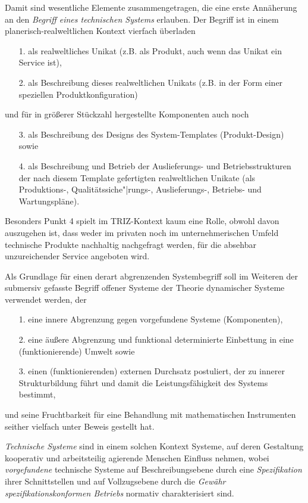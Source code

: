 \documentclass[12pt,a4paper]{article}
\begin{document}
Damit sind wesentliche Elemente zusammengetragen, die eine erste Annäherung an
den \emph{Begriff eines technischen Systems} erlauben.  Der Begriff ist in
einem planerisch-realweltlichen Kontext vierfach überladen
\begin{itemize}
\item [1.] als realweltliches Unikat (z.B. als Produkt, auch wenn das Unikat
  ein Service ist),
\item [2.] als Beschreibung dieses realweltlichen Unikats (z.B. in der Form
  einer speziellen Produktkonfiguration)
\end{itemize}
und für in größerer Stückzahl hergestellte Komponenten auch noch
\begin{itemize}
\item [3.] als Beschreibung des Designs des System-Templates (Produkt-Design)
  sowie
\item [4.] als Beschreibung und Betrieb der Auslieferungs- und
  Betriebsstrukturen der nach diesem Template gefertigten realweltlichen
  Unikate (als Produktions-, Qualitätssiche"|rungs-, Auslieferungs-, Betriebs-
  und Wartungspläne).
\end{itemize}
Besonders Punkt 4 spielt im TRIZ-Kontext kaum eine Rolle, obwohl davon
auszugehen ist, dass weder im privaten noch im unternehmerischen Umfeld
technische Produkte nachhaltig nachgefragt werden, für die absehbar
unzureichender Service angeboten wird.

Als Grundlage für einen derart abgrenzenden Systembegriff soll im Weiteren der
submersiv gefasste Begriff offener Systeme der Theorie dynamischer Systeme
\cite{Bertalanffy1950} verwendet werden, der
\begin{itemize}
\item [1.] eine innere Abgrenzung gegen vorgefundene Systeme (Komponenten), 
\item [2.] eine äußere Abgrenzung und funktional determinierte Einbettung in
  eine (funktionierende) Umwelt sowie
\item [3.] einen (funktionierenden) externen Durchsatz postuliert, der zu
  innerer Strukturbildung führt und damit die Leistungsfähigkeit des Systems
  bestimmt,
\end{itemize}
und seine Fruchtbarkeit für eine Behandlung mit mathematischen Instrumenten
seither vielfach unter Beweis gestellt hat.  

\emph{Technische Systeme} sind in einem solchen Kontext Systeme, auf deren
Gestaltung kooperativ und arbeitsteilig agierende Menschen Einfluss nehmen,
wobei \emph{vorgefundene} technische Systeme auf Beschreibungsebene durch eine
\emph{Spezifikation} ihrer Schnittstellen und auf Vollzugsebene durch die
\emph{Gewähr spezifikationskonformen Betriebs} normativ charakterisiert sind.
\end{document}
